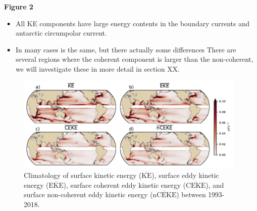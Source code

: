 \documentclass[draft,linenumbers]{agujournal2019}
\newcommand{\MKE}{\overline{\textrm{KE}}}
\newcommand{\MEKE}{\overline{\textrm{EKE}}}
\newcommand{\MCEKE}{\overline{\textrm{CEKE}}}
\newcommand{\MnCEKE}{\overline{\textrm{nCEKE}}}
\begin{document}
	\textbf{Figure 2}
	\begin{itemize}
		\item All KE components have large energy contents in the boundary currents and antarctic circumpolar current. 
		\item In many cases is the same, but there actually some differences There are several regions where the coherent component is larger than the non-coherent, we will investigate these in more detail in section XX.
	\end{itemize}

	\begin{figure}
	    \centering
	    \includegraphics[width=1\textwidth]{figures/mean_ke_maps_satellite.pdf}
	    \caption{Climatology of surface kinetic energy ($\MKE$), surface eddy kinetic energy ($\MEKE$), surface coherent eddy kinetic energy ($\MCEKE$), and surface non-coherent eddy kinetic energy ($\MnCEKE$) between 1993-2018.}
	    \label{fig:eddy_climatology}
	\end{figure}

\end{document}
